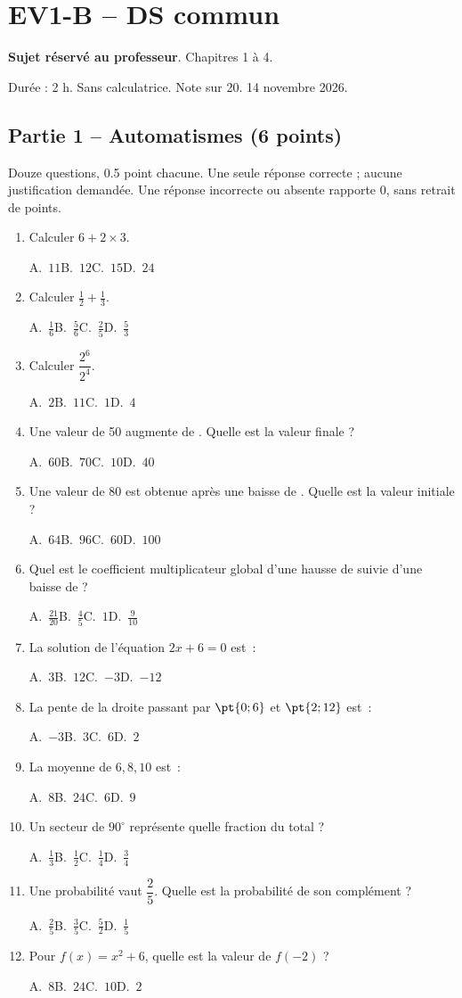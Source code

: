 \mxnewpage\section*{EV1-B -- DS commun}\label{EV1-B}
\textbf{Sujet réservé au professeur}. Chapitres 1 à 4.\par Durée : 2 h. Sans calculatrice. Note sur 20. 14 novembre 2026.
\subsection*{Partie 1 -- Automatismes (6 points)}
Douze questions, \num{0,5} point chacune. Une seule réponse correcte ; aucune justification demandée. Une réponse incorrecte ou absente rapporte 0, sans retrait de points.
\begin{enumerate}
\item Calculer $6+2\times3$.\par A.~$11$\quad B.~$12$\quad C.~$15$\quad D.~$24$
\item Calculer $\frac12+\frac13$.\par A.~$\frac{1}{6}$\quad B.~$\frac{5}{6}$\quad C.~$\frac{2}{5}$\quad D.~$\frac{5}{3}$
\item Calculer $\dfrac{2^6}{2^{4}}$.\par A.~$2$\quad B.~$11$\quad C.~$1$\quad D.~$4$
\item Une valeur de 50 augmente de . Quelle est la valeur finale ?\par A.~$60$\quad B.~$70$\quad C.~$10$\quad D.~$40$
\item Une valeur de 80 est obtenue après une baisse de . Quelle est la valeur initiale ?\par A.~$64$\quad B.~$96$\quad C.~$60$\quad D.~$100$
\item Quel est le coefficient multiplicateur global d'une hausse de  suivie d'une baisse de  ?\par A.~$\frac{21}{20}$\quad B.~$\frac{4}{5}$\quad C.~$1$\quad D.~$\frac{9}{10}$
\item La solution de l'équation $2x+6=0$ est~:\par A.~$3$\quad B.~$12$\quad C.~$-3$\quad D.~$-12$
\item La pente de la droite passant par $\pt{0;6}$ et $\pt{2;12}$ est~:\par A.~$-3$\quad B.~$3$\quad C.~$6$\quad D.~$2$
\item La moyenne de $6, 8, 10$ est~:\par A.~$8$\quad B.~$24$\quad C.~$6$\quad D.~$9$
\item Un secteur de $90^\circ$ représente quelle fraction du total ?\par A.~$\frac{1}{3}$\quad B.~$\frac{1}{2}$\quad C.~$\frac{1}{4}$\quad D.~$\frac{3}{4}$
\item Une probabilité vaut $\dfrac{2}{5}$. Quelle est la probabilité de son complément ?\par A.~$\frac{2}{5}$\quad B.~$\frac{3}{5}$\quad C.~$\frac{5}{2}$\quad D.~$\frac{1}{5}$
\item Pour $f(x)=x^2+6$, quelle est la valeur de $f(-2)$ ?\par A.~$8$\quad B.~$24$\quad C.~$10$\quad D.~$2$
\end{enumerate}
